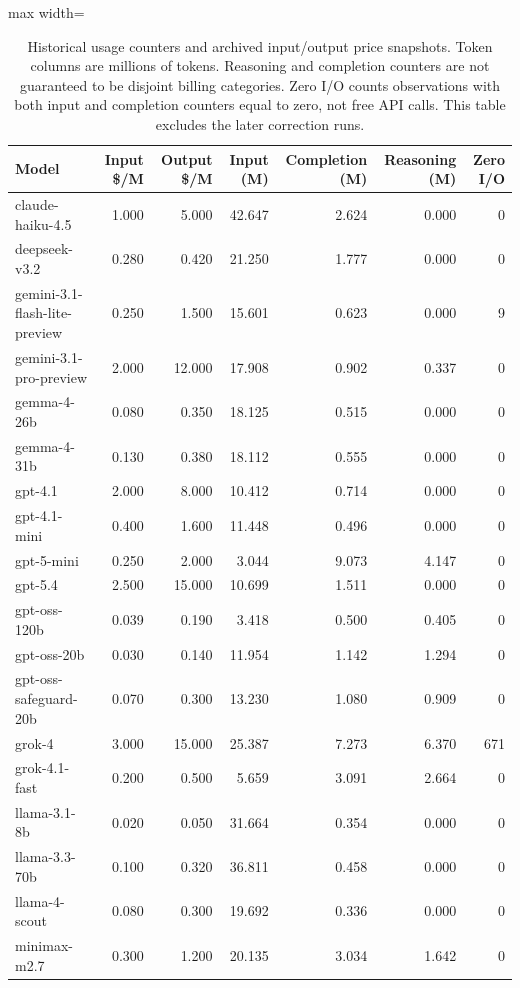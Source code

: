 \begin{table}[htbp]
\centering\small
\caption{Historical usage counters and archived input/output price snapshots. Token columns are millions of tokens. Reasoning and completion counters are not guaranteed to be disjoint billing categories. Zero I/O counts observations with both input and completion counters equal to zero, not free API calls. This table excludes the later correction runs.}
\label{tab:cost-breakdown}
\begin{adjustbox}{max width=\linewidth}
\begin{tabular}{lrrrrrr}
\toprule
Model & Input \$/M & Output \$/M & Input (M) & Completion (M) & Reasoning (M) & Zero I/O \\
\midrule
claude-haiku-4.5 & 1.000 & 5.000 & 42.647 & 2.624 & 0.000 & 0 \\
deepseek-v3.2 & 0.280 & 0.420 & 21.250 & 1.777 & 0.000 & 0 \\
gemini-3.1-flash-lite-preview & 0.250 & 1.500 & 15.601 & 0.623 & 0.000 & 9 \\
gemini-3.1-pro-preview & 2.000 & 12.000 & 17.908 & 0.902 & 0.337 & 0 \\
gemma-4-26b & 0.080 & 0.350 & 18.125 & 0.515 & 0.000 & 0 \\
gemma-4-31b & 0.130 & 0.380 & 18.112 & 0.555 & 0.000 & 0 \\
gpt-4.1 & 2.000 & 8.000 & 10.412 & 0.714 & 0.000 & 0 \\
gpt-4.1-mini & 0.400 & 1.600 & 11.448 & 0.496 & 0.000 & 0 \\
gpt-5-mini & 0.250 & 2.000 & 3.044 & 9.073 & 4.147 & 0 \\
gpt-5.4 & 2.500 & 15.000 & 10.699 & 1.511 & 0.000 & 0 \\
gpt-oss-120b & 0.039 & 0.190 & 3.418 & 0.500 & 0.405 & 0 \\
gpt-oss-20b & 0.030 & 0.140 & 11.954 & 1.142 & 1.294 & 0 \\
gpt-oss-safeguard-20b & 0.070 & 0.300 & 13.230 & 1.080 & 0.909 & 0 \\
grok-4 & 3.000 & 15.000 & 25.387 & 7.273 & 6.370 & 671 \\
grok-4.1-fast & 0.200 & 0.500 & 5.659 & 3.091 & 2.664 & 0 \\
llama-3.1-8b & 0.020 & 0.050 & 31.664 & 0.354 & 0.000 & 0 \\
llama-3.3-70b & 0.100 & 0.320 & 36.811 & 0.458 & 0.000 & 0 \\
llama-4-scout & 0.080 & 0.300 & 19.692 & 0.336 & 0.000 & 0 \\
minimax-m2.7 & 0.300 & 1.200 & 20.135 & 3.034 & 1.642 & 0 \\

\end{tabular}
\end{adjustbox}
\end{table}
